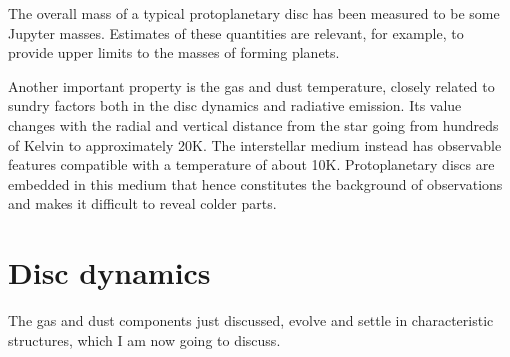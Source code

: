 \documentclass[a4paper,10pt]{report}
\begin{document}
The overall mass of a typical protoplanetary disc has been measured to be some Jupyter masses.
Estimates of these quantities are relevant, for example, to provide upper limits
to the masses of forming planets.

Another important property is the gas and dust temperature, closely related to sundry factors both in the disc dynamics and radiative emission.
Its value changes with the radial and vertical distance from the star going from hundreds of Kelvin to approximately 20K.
The interstellar medium instead has observable features compatible with a temperature of about 10K. Protoplanetary discs are embedded in this medium 
that hence constitutes the background of observations and makes it difficult to reveal colder parts.

\section{Disc dynamics}

The gas and dust components just discussed, 
evolve and settle in characteristic structures, which I am now going to discuss.
\end{document}
